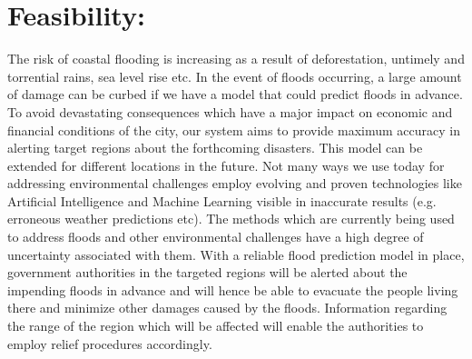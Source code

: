 \documentclass{article}
\begin{document}
	\section*{Feasibility:}
		The risk of coastal flooding is increasing as a result of deforestation, untimely and torrential rains, sea level rise etc. In the event of floods occurring, a large amount of damage can be curbed if we have a model that could predict floods in advance. To avoid devastating consequences which have a major impact on economic and financial conditions of the city, our system aims to provide maximum accuracy in alerting target regions about the forthcoming disasters. This model can be extended for different locations in the future.
Not many ways we use today for addressing environmental challenges employ evolving and proven technologies like Artificial Intelligence and Machine Learning visible in inaccurate results (e.g. erroneous weather predictions etc).  The methods which are currently being used to address floods and other environmental challenges have a high degree of uncertainty associated with them.
With a reliable flood prediction model in place, government authorities in the targeted regions will be alerted about the impending floods in advance and will hence be able to evacuate the people living there and minimize other damages caused by the floods. Information regarding the range of the region which will be affected will enable the authorities to employ relief procedures accordingly.
\end{document}
